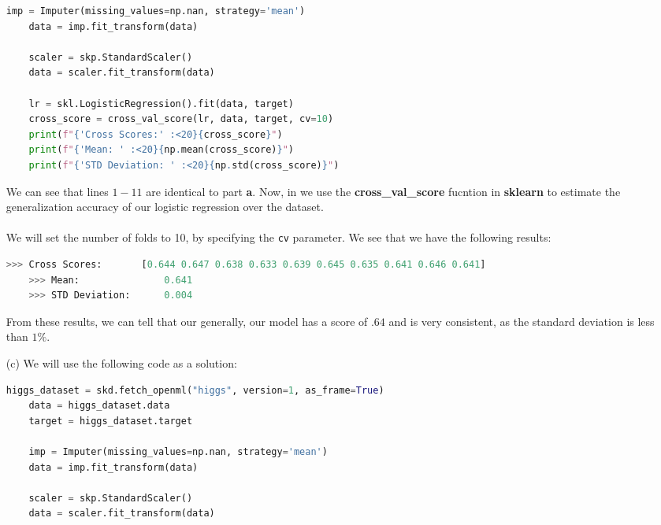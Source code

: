 \documentclass[12pt, letterpaper]{article}
\begin{document}
\begin{enumerate}
\begin{lstlisting}[language = python]
    imp = Imputer(missing_values=np.nan, strategy='mean')
    data = imp.fit_transform(data)
    
    scaler = skp.StandardScaler()
    data = scaler.fit_transform(data)
    
    lr = skl.LogisticRegression().fit(data, target)
    cross_score = cross_val_score(lr, data, target, cv=10)
    print(f"{'Cross Scores:' :<20}{cross_score}")   
    print(f"{'Mean: ' :<20}{np.mean(cross_score)}")
    print(f"{'STD Deviation: ' :<20}{np.std(cross_score)}")    
\end{lstlisting}
    We can see that lines $1-11$ are identical to part {\bf a}. Now, in we use the 
    {\bf cross\_val\_score} fucntion in {\bf sklearn} to estimate the generalization
    accuracy of our logistic regression over the dataset. \\ \\
    We will set the number of folds to 10, by specifying the \texttt{cv} parameter. 
    We see that we have the following results:
\begin{lstlisting}[language=python] 
    >>> Cross Scores:       [0.644 0.647 0.638 0.633 0.639 0.645 0.635 0.641 0.646 0.641]
    >>> Mean:               0.641
    >>> STD Deviation:      0.004
\end{lstlisting}
    From these results, we can tell that our generally, our model has a score of $.64$ and is
    very consistent, as the standard deviation is less than $1\%$. 
\newpage
    \item [(c)] We will use the following code as a solution: 
\begin{lstlisting}[language=python]
    higgs_dataset = skd.fetch_openml("higgs", version=1, as_frame=True)
    data = higgs_dataset.data
    target = higgs_dataset.target

    imp = Imputer(missing_values=np.nan, strategy='mean')
    data = imp.fit_transform(data)

    scaler = skp.StandardScaler()
    data = scaler.fit_transform(data)


\end{lstlisting}
\end{enumerate}
\end{document}
